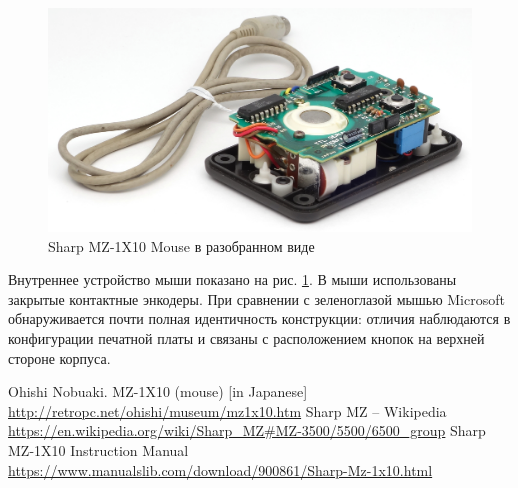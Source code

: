 \documentclass[11pt, a4paper]{article}
\begin{document}
 \begin{figure}[h]
    \centering
    \includegraphics[scale=0.8]{1983_sharp_mz_1x10_mouse/inside_30.jpg}
    \caption{Sharp MZ-1X10 Mouse в разобранном виде}
    \label{fig:SharpMZ1x10Inside}
\end{figure}

Внутреннее устройство мыши показано на рис. \ref{fig:SharpMZ1x10Inside}. В мыши использованы закрытые контактные энкодеры. При сравнении с зеленоглазой мышью Microsoft обнаруживается почти полная идентичность конструкции: отличия наблюдаются в конфигурации печатной платы и связаны с расположением кнопок на верхней стороне корпуса.

\begin{thebibliography}{9}
  Ohishi Nobuaki. MZ-1X10 (mouse) [in Japanese] \url{http://retropc.net/ohishi/museum/mz1x10.htm}
 Sharp MZ -- Wikipedia \url{https://en.wikipedia.org/wiki/Sharp_MZ#MZ-3500/5500/6500_group}
 Sharp MZ-1X10 Instruction Manual \url{https://www.manualslib.com/download/900861/Sharp-Mz-1x10.html}
\end{thebibliography}
\end{document}
